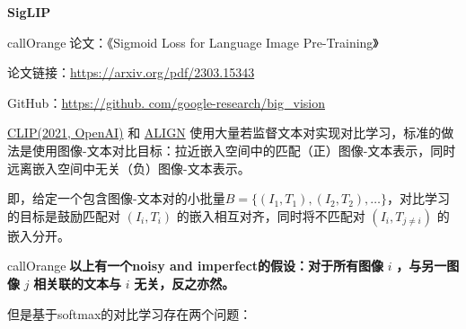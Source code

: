 \documentclass[zihao=false,fontset=windows]{ctexart}
\begin{document}
{\bfseries SigLIP\par}

\begin{feishubox}{callOrange}{📒}论文：《Sigmoid Loss for Language Image Pre-Training》\par 论文链接：\href{https://arxiv.org/pdf/2303.15343}{https://arxiv.org/pdf/2303.15343}\par GitHub：\href{https://link.zhihu.com/?target=https\%3A//github/}{https://github}\href{https://link.zhihu.com/?target=https\%3A//github/}{. com/google-research/big\_vision}\end{feishubox}

\par{}\vspace{1em}\par\vspace{0.28em}

\href{https://scnajei2ds6y.feishu.cn/wiki/FKvTwjSHxiVHBokxd5ncXxuanch}{CLIP(2021, OpenAI)} 和 \href{https://proceedings.mlr.press/v139/jia21b.html}{ALIGN} 使用大量若监督文本对实现对比学习，标准的做法是使用图像-文本对比目标：拉近嵌入空间中的匹配（正）图像-文本表示，同时远离嵌入空间中无关（负）图像-文本表示。\par

即，给定一个包含图像-文本对的小批量$B=\{(I_1,T_1),(I_2,T_2),\ldots\}$，对比学习的目标是鼓励匹配对 $(I_i,T_i)$ 的嵌入相互对齐，同时将不匹配对 $(I_i,T_{j\neq i})$ 的嵌入分开。\par

\begin{feishubox}{callOrange}{🤔}\textcolor{feishuRed}{\textbf{以上有一个noisy and imperfect的假设：对于所有图像 }}{\boldmath $i$}\textcolor{feishuRed}{\textbf{ ，与另一图像 }}{\boldmath $j$}\textcolor{feishuRed}{\textbf{ 相关联的文本与 }}{\boldmath $i$}\textcolor{feishuRed}{\textbf{ 无关，反之亦然。}}\end{feishubox}

但是基于softmax的对比学习存在两个问题：\par
\end{document}
